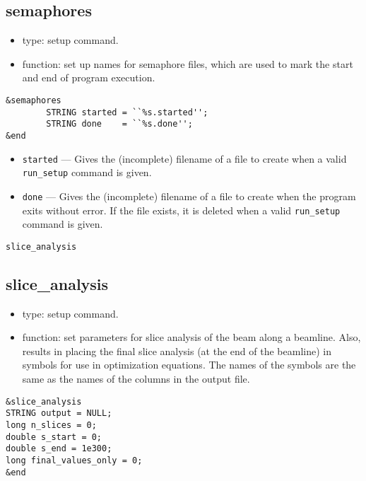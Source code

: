 \documentclass[11pt]{article}
\begin{document}
\subsection{semaphores \label{subsec:semaphores}}

\begin{itemize}
\item type: setup command.
\item function: set up names for semaphore files, which are used to mark the
        start and end of program execution.
\end{itemize}

\begin{verbatim}
&semaphores
        STRING started = ``%s.started'';
        STRING done    = ``%s.done'';
&end
\end{verbatim}

\begin{itemize}
\item {\tt started} --- Gives the (incomplete) filename of a file to create when a valid
        {\tt run\_setup} command is given.
\item {\tt done} --- Gives the (incomplete) filename of a file to create when the program
        exits without error.  If the file exists, it is deleted when a valid {\tt run\_setup}
        command is given.
\end{itemize}

\begin{latexonly}
\newpage
\begin{center}{\Large\verb|slice_analysis|}\end{center}
\end{latexonly}
\subsection{slice\_analysis \label{subsec:sliceanalysis}}

\begin{itemize}
\item type: setup command.
\item function: set parameters for slice analysis of the beam along a
	beamline.  Also, results in placing the final slice analysis
        (at the end of the beamline) in symbols for use in optimization
        equations.  The names of the symbols are the same as the names
        of the columns in the output file.
\end{itemize}

\begin{verbatim}
&slice_analysis
STRING output = NULL;
long n_slices = 0;
double s_start = 0;
double s_end = 1e300;
long final_values_only = 0;
&end
\end{verbatim}
\end{document}
